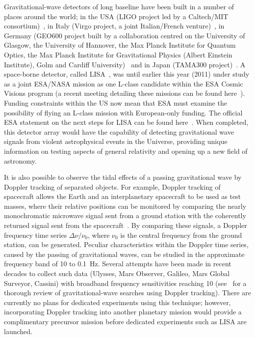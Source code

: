 Gravitational-wave detectors of long baseline have been built in a number of
places around the world; in the USA (LIGO project led by a Caltech/MIT
consortium)~\cite{LIGOS5, LIGOweb}, in Italy (Virgo project, a joint
Italian/French venture)~\cite{Acernese:2007, VIRGOweb}, in Germany (GEO600
project built by a collaboration centred on the University of Glasgow, the
University of Hannover, the Max Planck Institute for Quantum Optics, the Max
Planck Institute for Gravitational Physics (Albert Einstein Institute), Golm and
Cardiff University)~\cite{Willke:2007, GEOweb} and in Japan (TAMA300
project)~\cite{TAMAStatus, TAMAweb}. A space-borne detector, called
LISA~\cite{LISA, NASAweb, ESAweb}, was until earlier this year (2011)
under study as a joint ESA/NASA mission as one L-class candidate
within the ESA Cosmic Visions program (a recent meeting detailing
these missions can be found here~\cite{ESACosmicVisions}). Funding
constraints within the US now mean that ESA must examine the
possibility of flying an L-class mission with European-only
funding. The official ESA statement on the next steps for LISA can be
found here~\cite{LISAESAstatement}. When completed, this detector
array would have the capability of detecting gravitational wave
signals from violent astrophysical events in the Universe, providing
unique information on testing aspects of general relativity and
opening up a new field of astronomy.


It is also possible to observe the tidal effects of a passing gravitational
wave by Doppler tracking of separated objects. For example, Doppler tracking of
spacecraft allows the Earth and an interplanetary spacecraft to be used as test
masses, where their relative positions can be monitored by comparing the nearly
monochromatic microwave signal sent from a ground station with the coherently
returned signal sent from the spacecraft~\cite{Estabrook:1975}. By comparing
these signals, a Doppler frequency time series $\Delta \nu / \nu_0$, where
$\nu_0$ is the central frequency from the ground station, can be generated.
Peculiar characteristics within the Doppler time series, caused by the passing
of gravitational waves, can be studied in the approximate frequency band of
10 to 0.1~Hz. Several attempts have been made in recent decades to
collect such data (Ulysses, Mars Observer, Galileo, Mars Global Surveyor,
Cassini) with broadband frequency sensitivities reaching 10
(see~\cite{Armstrong:2006} for a thorough review of gravitational-wave
searches using Doppler tracking). There are currently no plans for
dedicated experiments using this technique; however, incorporating
Doppler tracking into another planetary mission would provide a
complimentary precursor mission before dedicated experiments such as
LISA are launched.


